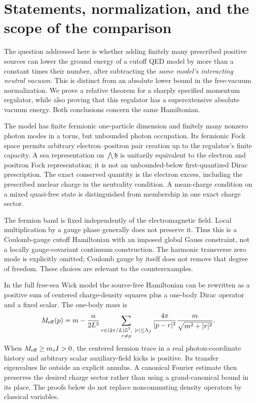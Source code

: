 \section{Statements, normalization, and the scope of the comparison}
\label{b-introduction}

The question addressed here is whether adding finitely many prescribed
positive sources can lower the ground energy of a cutoff QED model
by more than a constant times their number, after subtracting the
\emph{same model's interacting neutral vacuum}. This is distinct from
an absolute lower bound in the free-vacuum normalization. We prove a
relative theorem for a sharply specified momentum regulator, while
also proving that this regulator has a superextensive absolute
vacuum energy. Both conclusions concern the same Hamiltonian.

The model has finite fermionic one-particle dimension and finitely
many nonzero photon modes in a torus, but unbounded photon occupation.
Its fermionic Fock space permits arbitrary electron--positron pair
creation up to the regulator's finite capacity. A sea representation
on $\bigwedge\mathfrak h$ is unitarily equivalent to the electron and
positron Fock representation; it is not an unbounded-below
first-quantized Dirac prescription. The exact conserved quantity is
the electron excess, including the prescribed nuclear charge in the
neutrality condition. A mean-charge condition on a mixed quasi-free
state is distinguished from membership in one exact charge sector.

The fermion band is fixed independently of the electromagnetic
field. Local multiplication by a gauge phase generally does not
preserve it. Thus this is a Coulomb-gauge cutoff Hamiltonian with
an imposed global Gauss constraint, not a locally gauge-covariant
continuum construction. The harmonic transverse zero mode is
explicitly omitted; Coulomb gauge by itself does not remove that
degree of freedom. These choices are relevant to the counterexamples.

In the full free-sea Wick model the source-free Hamiltonian can be
rewritten as a positive sum of centered charge-density squares plus
a one-body Dirac operator and a fixed scalar. The one-body mass is
\[
 M_{\rm eff}(p)=m-\frac{\alpha}{2L^3}
 \sum_{\substack{r\in(2\pi/L)\mathbb Z^3,\ |r|\le\Lambda_f\\r\ne p}}
 \frac{4\pi}{|p-r|^2}\frac{m}{\sqrt{m^2+|r|^2}}.
\]
When $M_{\rm eff}\ge m_*I>0$, the centered fermion trace in a
real photon-coordinate history and arbitrary scalar auxiliary-field
kicks is positive. Its transfer eigenvalues lie outside an explicit
annulus. A canonical Fourier estimate then preserves the desired
charge sector rather than using a grand-canonical bound in its place.
The proofs below do not replace noncommuting density operators by
classical variables.

